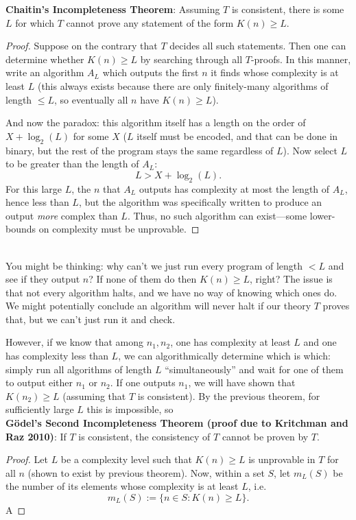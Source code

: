 \documentclass{amsart}
\begin{document}
	\textbf{Chaitin's Incompleteness Theorem}: Assuming $T$ is consistent, there is some $L$ for which $T$ cannot prove any statement of the form $K(n)\geq L$.
	\begin{proof}
		Suppose on the contrary that $T$ decides all such statements. Then one can determine whether $K(n)\geq L$ by searching through all $T$-proofs. In this manner, write an algorithm $A_L$ which outputs the first $n$ it finds whose complexity is at least $L$ (this always exists because there are only finitely-many algorithms of length $\leq L$, so eventually all $n$ have $K(n)\geq L$).
		
		And now the paradox: this algorithm itself has a length on the order of $X + \log_2(L)$ for some $X$ ($L$ itself must be encoded, and that can be done in binary, but the rest of the program stays the same regardless of $L$). Now select $L$ to be greater than the length of $A_L$: 
		$$L> X + \log_2(L).$$ 
		For this large $L$, the $n$ that $A_L$ outputs has complexity at most the length of $A_L$, hence less than $L$, but the algorithm was specifically written to produce an output \textit{more} complex than $L$. Thus, no such algorithm can exist---some lower-bounds on complexity must be unprovable. 
	\end{proof}\\
	
	You might be thinking: why can't we just run every program of length $<L$ and see if they output $n$? If none of them do then $K(n)\geq L$, right? The issue is that not every algorithm halts, and we have no way of knowing which ones do. We might potentially conclude an algorithm will never halt if our theory $T$ proves that, but we can't just run it and check.
	
	However, if we know that among $n_1,n_2$, one has complexity at least $L$ and one has complexity less than $L$, we can algorithmically determine which is which: simply run all algorithms of length $L$ ``simultaneously'' and wait for one of them to output either $n_1$ or $n_2$. If one outputs $n_1$, we will have shown that $K(n_2)\geq L$ (assuming that $T$ is consistent). By the previous theorem, for sufficiently large $L$ this is impossible, so\\
	
	\textbf{G\"odel's Second Incompleteness Theorem (proof due to Kritchman and Raz 2010)}: If $T$ is consistent, the consistency of $T$ cannot be proven by $T$.
	\begin{proof}
		Let $L$ be a complexity level such that $K(n)\geq L$ is unprovable in $T$ for all $n$ (shown to exist by previous theorem). Now, within a set $S$, let $m_L(S)$ be the number of its elements whose complexity is at least $L$, i.e.
		$$m_L(S) := \{n\in S: K(n)\geq L\}.$$
		A
	\end{proof}
 	
\end{document}
